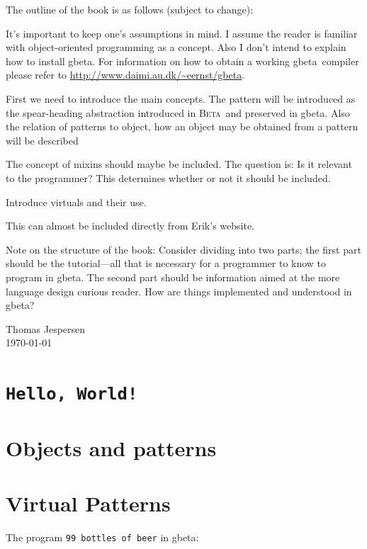 \documentclass[openany]{memoir}
\newcommand{\gbeta}{\textsf{gbeta}}
\renewcommand{\beta}{\textsc{Beta}}
\begin{document}
The outline of the book is as follows (subject to change):

\begin{description}\setlength{\itemsep}{-2pt}
\item[Assumptions] It's important to keep one's assumptions in mind. I
  assume the reader is familiar with object-oriented programming as a
  concept. Also I don't intend to explain how to install \gbeta . For
  information on how to obtain a working \gbeta\ compiler please refer
  to \url{http://www.daimi.au.dk/~eernst/gbeta}.
\item[Objects and Patterns] First we need to introduce the main concepts. The
  pattern will be introduced as the spear-heading abstraction
  introduced in \beta\ and preserved in \gbeta . Also the relation of
  patterns to object, how an object may be obtained from a pattern
  will be described
\item[Mixins] The concept of mixins should maybe be included. The
  question is: Is it relevant to the programmer? This determines
  whether or not it should be included.
\item[Virtual patterns] Introduce virtuals and their use.
\item[The fragment language] This can almost be included directly from
  Erik's website.
\end{description}

Note on the structure of the book: Consider dividing into two parts;
the first part should be the tutorial---all that is necessary for a
programmer to know to program in \gbeta . The second part should be
information aimed at the more language design curious reader. How are
things implemented and understood in \gbeta ?

\begin{flushright}
  Thomas Jespersen\\\today
\end{flushright}

\mainmatter

\chapter{\texttt{Hello, World!}}



\chapter{Objects and patterns}



\chapter{Virtual Patterns}



\newpage

The program \texttt{99 bottles of beer} in \gbeta :





\end{document}
